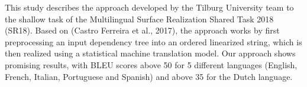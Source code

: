 This study describes the approach developed by the Tilburg University team to the shallow task of the Multilingual Surface Realization Shared Task 2018 (SR18). Based on (Castro Ferreira et al., 2017), the approach works by first preprocessing an input dependency tree  into an ordered linearized string, which is then realized using a statistical machine translation model. Our approach shows promising results, with BLEU scores above 50 for 5 different languages (English, French, Italian, Portuguese and Spanish) and above 35 for the Dutch language.
